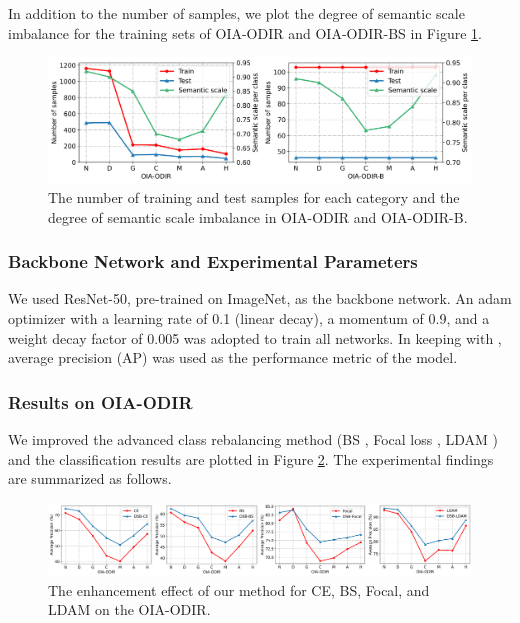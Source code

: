 \documentclass[10pt]{article} %
\begin{document}
In addition to the number of samples, we plot the degree of semantic scale imbalance for the training sets of OIA-ODIR and OIA-ODIR-BS in Figure \ref{fig12}.

\begin{figure}[h]
\begin{center}
\includegraphics[width=1\columnwidth]{nfig12}
\vskip -0.1in
\caption{The number of training and test samples for each category and the degree of semantic scale imbalance in OIA-ODIR and OIA-ODIR-B.}
\label{fig12}
\end{center}
\vskip -0.05in
\end{figure}

\subsubsection{Backbone Network and Experimental Parameters} 
We used ResNet-50, pre-trained on ImageNet, as the backbone network. An adam optimizer with a learning rate of 0.1 (linear decay), a momentum of 0.9, and a weight decay factor of 0.005 was adopted to train all networks. In keeping with \cite {paper110}, average precision (AP) was used as the performance metric of the model.


\subsubsection{Results on OIA-ODIR}
We improved the advanced class rebalancing method (BS \cite {paper105}, Focal loss \cite {paper14}, LDAM \cite {paper104}) and the classification results are plotted in Figure \ref{fig13}. The experimental findings are summarized as follows.

\begin{figure}[h]
\begin{center}
\includegraphics[width=1\columnwidth]{nfig13}
\vskip -0.05in
\caption{The enhancement effect of our method for CE, BS, Focal, and LDAM on the OIA-ODIR.}
\label{fig13}
\end{center}
\vskip -0.15in
\end{figure}
\end{document}
